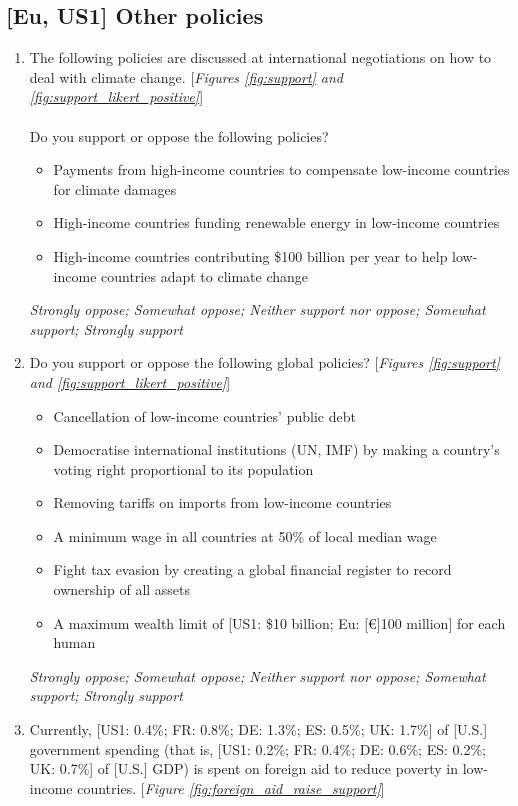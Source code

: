 \subsection*{[Eu, US1] Other policies}
\begin{enumerate}[resume] \item \label{q:climate_policies} The following policies are discussed  at international negotiations on how to deal with climate change. [\textit{Figures \ref{fig:support} and \ref{fig:support_likert_positive}}]\\
\\
Do you support or oppose the following policies?
\begin{itemize}
    \item Payments from high-income countries to compensate low-income countries for climate damages 
    \item High-income countries funding renewable energy in low-income countries
    \item High-income countries contributing \$100 billion per year to help low-income countries adapt to climate change
\end{itemize}
\textit{Strongly oppose; Somewhat oppose; Neither support nor oppose; Somewhat support; Strongly support}
\item \label{q:other_policies} Do you support or oppose the following global policies? [\textit{Figures \ref{fig:support} and \ref{fig:support_likert_positive}}]
\begin{itemize}
    \item Cancellation of low-income countries' public debt 
    \item Democratise international institutions (UN, IMF) by making a country's voting right proportional to its population 
    \item Removing tariffs on imports from low-income countries
    \item A minimum wage in all countries at 50\% of local median wage
    \item Fight tax evasion by creating a global financial register to record ownership of all assets
    \item A maximum wealth limit of [US1: \$10 billion; Eu: [\euro{}]100 million] for each human 
\end{itemize}
\textit{Strongly oppose; Somewhat oppose; Neither support nor oppose; Somewhat support; Strongly support}
\item \label{q:foreign_aid_raise_support} Currently, [US1: 0.4\%; FR: 0.8\%; DE: 1.3\%; ES: 0.5\%; UK: 1.7\%] of [U.S.] government spending (that is, [US1: 0.2\%; FR: 0.4\%; DE: 0.6\%; ES: 0.2\%; UK: 0.7\%] of [U.S.] GDP) is spent on foreign aid to reduce poverty in low-income countries. [\textit{Figure \ref{fig:foreign_aid_raise_support}}]\\

\end{enumerate}
